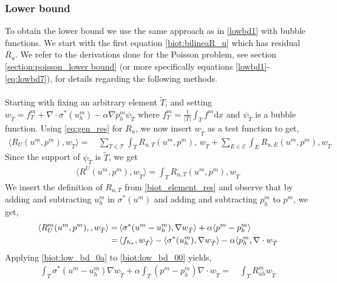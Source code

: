 \subsubsection{Lower bound} \label{biot_low_bd}
To obtain the lower bound we use the same approach as in \ref{lowbd1} with bubble functions. We start with the first equation \eqref{biot:bilineaR_u} which has residual $R_u$. We refer to the derivations done for the Poisson problem, see section \ref{section:poisson_lower bound} (or more specifically equations \eqref{lowbd1}-\eqref{eq:lowbd7}), for details regarding the following methods. 
\\
\\
Starting with fixing an arbitrary element $\tilde{T}$, and setting $w_{\tilde{T}} = f_T^m + \nabla \cdot \sigma^{\ast}(u_h^m) - \alpha \nabla p_h^m \psi_{\tilde{T}}$ where $f^m_T = \frac{1}{|T|}\int_T f^m \mathrm{d}x$ and $\psi_{\tilde{T}}$ is a bubble function. Using \eqref{eq:gen_res} for $R_u$, we now insert $w_{\tilde{T}}$ as a test function to get, 
\begin{align}
\langle R_{U}(u^m, p^m), w_{\tilde{T}} \rangle = & \, \displaystyle\sum_{T \in \mathcal{T}}\displaystyle\int_T R_{u,T}(u^m, p^m),\, w_{\tilde{T}} + \displaystyle\sum_{E \in \mathcal{E}}\displaystyle\int_E R_{u,E}(u^m, p^m), w_{\tilde{T}} 
\end{align}
Since the support of $\psi_{\tilde{T}}$ is $\tilde{T}$, we get
\begin{align}\label{biot:low_bd_00}
\langle R^{U}(u^m, p^m), w_{\tilde{T}} \rangle  =  \displaystyle\int_T R_{u,T}(u^m, p^m), w_{\tilde{T}}
\end{align}
We insert the definition of $R_{u,T}$ from \eqref{biot_element_res} and observe that by adding and subtracting $u^m_h$ in $\sigma^*(u^m)$ and adding and subtracting $p_h^m$ to $p^m$, we get,
\\
\begin{align} \label{biot:low_bd_0a}
\langle R^m_U(u^m, p^m),, w_{\tilde{T}} \rangle = & \,\langle \sigma^* (u^m-u^m_h), \nabla w_{\tilde{T}} \rangle  + \alpha \langle p^m -p^m_h \rangle \\
= & \, \langle f_{h_\tau}, w_{\tilde{T}}\rangle - \langle \sigma^*(u_h^m), \nabla w_{\tilde{T}}\rangle - \alpha \langle p_h^m, \nabla \cdot w_{\tilde{T}} \notag
\end{align}
Applying \eqref{biot:low_bd_0a} to \eqref{biot:low_bd_00} yields,
\\
\begin{align} \label{biot:low_bd_001}
\int_T \sigma^*(u^m-u^m_h) \nabla w_{\tilde{T}} + \alpha \int_T (p^m-p_h^m) \nabla \cdot w_{\tilde{T}} = & \, \int_T R^m_{uh} w_{\tilde{T}} 
\end{align}
